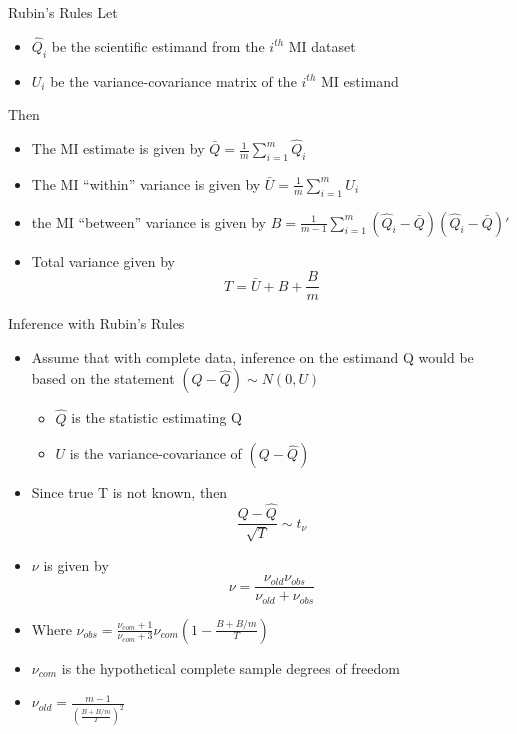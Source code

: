 \begin{frame}{Rubin's Rules}
 Let
 \begin{itemize}
  \item $\hat{Q}_i$ be the scientific estimand from the $i^{th}$ MI dataset
  \item $U_i$ be the variance-covariance matrix of the $i^{th}$ MI estimand
 \end{itemize}
Then
\begin{itemize}
 \item The MI estimate is given by
 $\bar{Q}=\frac{1}{m}\sum_{i=1}^{m}\hat{Q}_i$
 \item The MI ``within'' variance is given by
 $\bar{U}=\frac{1}{m}\sum_{i=1}^{m}U_i$
 \item the MI ``between'' variance is given by
 $B=\frac{1}{m-1}\sum_{i=1}^{m}(\hat{Q}_i - \bar{Q})(\hat{Q}_i - \bar{Q})'$ %
   \item Total variance given by \cite{Rubin1987}
  $$T=\bar{U}+B +\frac{B}{m}$$
\end{itemize}

\end{frame}

\begin{frame}{Inference with Rubin's Rules}
 \begin{itemize}
  \item Assume that with complete data, inference on the estimand
  Q would be based on the statement $(Q- \hat{Q})\sim N(0,U)$
  \begin{itemize}
   \item $\hat{Q}$ is the statistic estimating Q
   \item $U$ is the variance-covariance of $(Q-\hat{Q})$
  \end{itemize}
   \item Since true T is not known, then
  $$\frac{Q-\hat{Q}}{\sqrt{T}}\sim t_{\nu}$$
  \item $\nu$ is given by \cite{Barnard1999}
  $$\nu=\frac{\nu_{old}\nu_{obs}}{\nu_{old}+\nu_{obs}}$$
\item Where $\nu_{obs}=\frac{\nu_{com}+1}{\nu_{com}+3}\nu_{com}(1-\frac{B + B/m}{T})$
\item $\nu_{com}$ is the hypothetical complete sample degrees of freedom
\item $\nu_{old}=\frac{m-1}{(\frac{B + B/m}{T})^2}$ 
 \end{itemize}

\end{frame}



